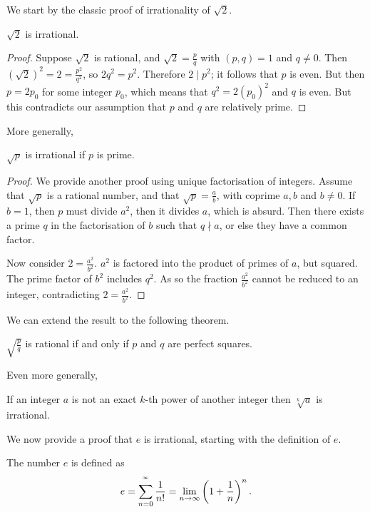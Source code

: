 \documentclass[main.tex]{subfiles}
\begin{document}
		We start by the classic proof of irrationality of $\sqrt{2}$.
		\begin{theorem}
			$\sqrt{2}$ is irrational.
		\end{theorem}
		\begin{proof}
			Suppose $\sqrt{2}$ is rational, and $\sqrt{2} = \frac{p}{q}$ with $(p, q) = 1$ and $q \neq 0$. Then $(\sqrt{2})^2 = 2 = \frac{p^2}{q^2}$, so $2q^2 = p^2$. Therefore $2 \mid p^2$; it follows that $p$ is even. But then $p = 2p_0$ for some integer $p_0$, which means that $q^2 = 2{(p_0)}^2$ and $q$ is even. But this contradicts our assumption that $p$ and $q$ are relatively prime.
		\end{proof}
	
		More generally,
		\begin{theorem}
			$\sqrt{p}$ is irrational if $p$ is prime.
		\end{theorem}
		\begin{proof}
			We provide another proof using unique factorisation of integers.
			Assume that $\sqrt{p}$ is a rational number, and that $\sqrt{p} = \frac{a}{b}$, with coprime $a, b$ and $b \neq 0$. If $b = 1$, then $p$ must divide $a^2$, then it divides $a$, which is absurd. Then there exists a prime $q$ in the factorisation of $b$ such that $q \nmid a$, or else they have a common factor.
			
			Now consider $2 = \frac{a^2}{b^2}$. $a^2$ is factored into the product of primes of $a$, but squared. The prime factor of $b^2$ includes $q^2$. As so the fraction $\frac{a^2}{b^2}$ cannot be reduced to an integer, contradicting $2 = \frac{a^2}{b^2}$.
		\end{proof}
		We can extend the result to the following theorem.
		\begin{theorem}
			$\sqrt{\frac{p}{q}}$ is rational if and only if $p$ and $q$ are perfect squares.
		\end{theorem}
		Even more generally,
		\begin{theorem}
			If an integer $a$ is not an exact $k$-th power of another integer then $\sqrt[k]{a}$ is irrational.
		\end{theorem}
		We now provide a proof that $e$ is irrational, starting with the definition of $e$.
		\begin{definition}
			The number $e$ is defined as
			\begin{equation*}
				 e = \sum_{n = 0}^{^\infty}\frac{1}{n!} = \lim_{n \rightarrow \infty}\left( 1 + \frac{1}{n}\right)^n.
			\end{equation*}
		\end{definition}
\end{document}
